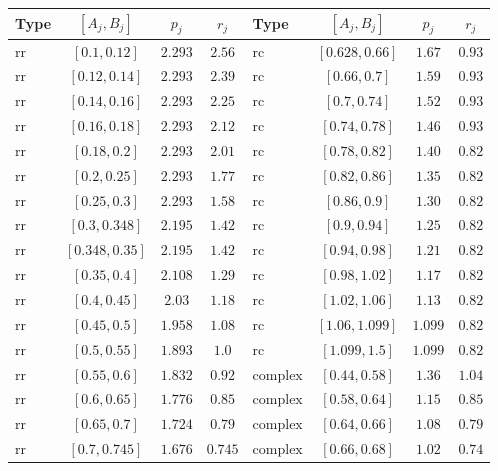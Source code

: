\begin{table}[tp]
\centering
\small
\begin{tabular}{@{}lccc@{\qquad\qquad}lccc@{}}
\toprule
Type & $[A_j,B_j]$ & $p_j$ & $r_j$ & Type & $[A_j,B_j]$ & $p_j$ & $r_j$\\
\midrule
$\mathrm{rr}$ & $[0.1,0.12]$ & $2.293$ & $2.56$ & $\mathrm{rc}$ & $[0.628,0.66]$ & $1.67$ & $0.93$ \\
$\mathrm{rr}$ & $[0.12,0.14]$ & $2.293$ & $2.39$ & $\mathrm{rc}$ & $[0.66,0.7]$ & $1.59$ & $0.93$ \\
$\mathrm{rr}$ & $[0.14,0.16]$ & $2.293$ & $2.25$ & $\mathrm{rc}$ & $[0.7,0.74]$ & $1.52$ & $0.93$ \\
$\mathrm{rr}$ & $[0.16,0.18]$ & $2.293$ & $2.12$ & $\mathrm{rc}$ & $[0.74,0.78]$ & $1.46$ & $0.93$ \\
$\mathrm{rr}$ & $[0.18,0.2]$ & $2.293$ & $2.01$ & $\mathrm{rc}$ & $[0.78,0.82]$ & $1.40$ & $0.82$ \\
$\mathrm{rr}$ & $[0.2,0.25]$ & $2.293$ & $1.77$ & $\mathrm{rc}$ & $[0.82,0.86]$ & $1.35$ & $0.82$ \\
$\mathrm{rr}$ & $[0.25,0.3]$ & $2.293$ & $1.58$ & $\mathrm{rc}$ & $[0.86,0.9]$ & $1.30$ & $0.82$ \\
$\mathrm{rr}$ & $[0.3,0.348]$ & $2.195$ & $1.42$ & $\mathrm{rc}$ & $[0.9,0.94]$ & $1.25$ & $0.82$ \\
$\mathrm{rr}$ & $[0.348,0.35]$ & $2.195$ & $1.42$ & $\mathrm{rc}$ & $[0.94,0.98]$ & $1.21$ & $0.82$ \\
$\mathrm{rr}$ & $[0.35,0.4]$ & $2.108$ & $1.29$ & $\mathrm{rc}$ & $[0.98,1.02]$ & $1.17$ & $0.82$ \\
$\mathrm{rr}$ & $[0.4,0.45]$ & $2.03$ & $1.18$ & $\mathrm{rc}$ & $[1.02,1.06]$ & $1.13$ & $0.82$ \\
$\mathrm{rr}$ & $[0.45,0.5]$ & $1.958$ & $1.08$ & $\mathrm{rc}$ & $[1.06,1.099]$ & $1.099$ & $0.82$ \\
$\mathrm{rr}$ & $[0.5,0.55]$ & $1.893$ & $1.0$ & $\mathrm{rc}$ & $[1.099,1.5]$ & $1.099$ & $0.82$ \\
$\mathrm{rr}$ & $[0.55,0.6]$ & $1.832$ & $0.92$ & $\mathrm{complex}$ & $[0.44,0.58]$ & $1.36$ & $1.04$ \\
$\mathrm{rr}$ & $[0.6,0.65]$ & $1.776$ & $0.85$ & $\mathrm{complex}$ & $[0.58,0.64]$ & $1.15$ & $0.85$ \\
$\mathrm{rr}$ & $[0.65,0.7]$ & $1.724$ & $0.79$ & $\mathrm{complex}$ & $[0.64,0.66]$ & $1.08$ & $0.79$ \\
$\mathrm{rr}$ & $[0.7,0.745]$ & $1.676$ & $0.745$ & $\mathrm{complex}$ & $[0.66,0.68]$ & $1.02$ & $0.74$ \\

\end{tabular}
\end{table}
